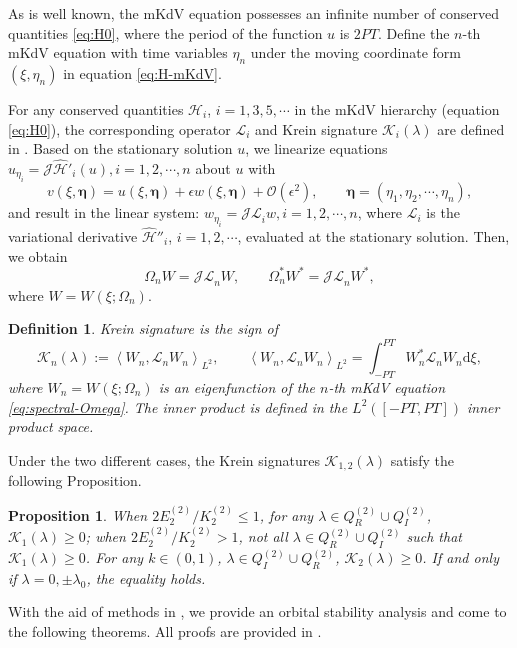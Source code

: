 \documentclass[11pt,reqno]{amsart}
\newcommand{\dd}{\mathrm{d}}
\newtheorem{prop}{Proposition}
\newtheorem{define}{Definition}
\numberwithin{equation}{section}
\begin{document}
As is well known, the mKdV equation possesses an infinite number of conserved quantities \eqref{eq:H0}, where the period of the function $u$ is $2PT$.
Define the $n$-th mKdV equation with time variables $\eta_n$ under the moving coordinate form $(\xi,\eta_n)$ in equation \eqref{eq:H-mKdV}.

For any conserved quantities $\mathcal{H}_i$, $i=1,3,5,\cdots$ in the mKdV hierarchy (equation \eqref{eq:H0}), the corresponding operator $\mathcal{L}_i$ and Krein signature $\mathcal{K}_i(\lambda)$ are defined in . 
Based on the stationary solution $u$, we linearize equations $u_{\eta_i}=\mathcal{J}\hat{\mathcal{H}}'_i(u),i=1,2,\cdots,n$ about $u$ with 
\begin{equation}\nonumber
	v(\xi,\boldsymbol{\eta})=u(\xi,\boldsymbol{\eta})+\epsilon w(\xi,\boldsymbol{\eta})+\mathcal{O}(\epsilon^2), \qquad \boldsymbol{\eta}=\left(\eta_1,\eta_2,\cdots,\eta_n\right),
\end{equation}
and result in the linear system: $w_{\eta_i}=\mathcal{JL}_{i}w, i=1,2,\cdots,n$, where $\mathcal{L}_i$ is the variational derivative $\hat{\mathcal{H}}''_{i}$, $i=1,2,\cdots$, evaluated at the stationary solution. Then, we obtain
\begin{equation} \label{eq:spectral-Omega}
	\Omega_nW=\mathcal{JL}_nW,\qquad \Omega_n^*W^*=\mathcal{JL}_nW^*, 
\end{equation} 
where $W=W(\xi;\Omega_n)$.
\begin{define}\label{defin:Krein}
	Krein signature is the sign of 
	\begin{equation}\label{eq:define-krein}
		\mathcal{K}_n(\lambda):=\left\langle W_n,\mathcal{L}_n W_n \right\rangle_{L^2}, \qquad \left\langle W_n,\mathcal{L}_n W_n \right\rangle_{L^2}=\int_{-PT}^{PT}W_n^*\mathcal{L}_n W_n \dd \xi,
	\end{equation}
	where $W_n=W(\xi;\Omega_n)$ is an eigenfunction of the $n$-th mKdV equation \eqref{eq:spectral-Omega}. 
	The inner product is defined in the $L^2([-PT,PT])$ inner product space.
\end{define}
Under the two different cases, the Krein signatures $\mathcal{K}_{1,2}(\lambda)$ satisfy the following Proposition.
\begin{prop}\label{prop:kerin}
	When $2 E^{(2)}_2/  K^{(2)}_2\le 1$, for any $\lambda \in  Q^{(2)} _R\cup  Q^{(2)} _I$, $\mathcal{K}_1(\lambda)\ge 0$; when $2 E^{(2)}_2/  K^{(2)}_2>1$, not all $\lambda \in  Q^{(2)} _R\cup  Q^{(2)} _I$ such that $\mathcal{K}_1(\lambda)\ge 0$.
	For any $k\in (0,1)$, $\lambda\in Q^{(2)}_I\cup Q^{(2)}_R$, $\mathcal{K}_2(\lambda)\ge 0$. If and only if $\lambda=0,\pm \lambda_0$, the equality holds.
\end{prop}
With the aid of methods in \cite{GrillakisSS-87,GrillakisSS-90,KapitulaP-13}, we provide an orbital stability analysis and come to the following theorems. All proofs are provided in .
\end{document}
